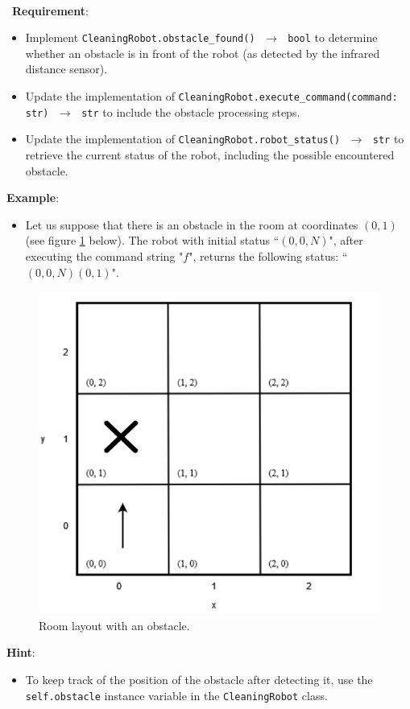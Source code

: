 \ \\ \
\noindent\textbf{Requirement}:
\begin{itemize}
    \item Implement \texttt{CleaningRobot.obstacle\_found() $\,\to\,$  bool} to determine whether an obstacle is in front of the robot (as detected by the infrared distance sensor).
    \item Update the implementation of \texttt{CleaningRobot.execute\_command(command: str) $\,\to\,$  str} to include the obstacle processing steps.
    \item Update the implementation of \texttt{CleaningRobot.robot\_status() $\,\to\,$  str} to retrieve the current status of the robot, including the possible encountered obstacle.
\end{itemize}

\noindent\textbf{Example}:
\begin{itemize}
    \item Let us suppose that there is an obstacle in the room at coordinates $(0,1)$ (see figure \ref{room_obstacle} below). The robot with initial status ``$(0,0,N)$", after executing the command string "$f$", returns the following status: ``$(0,0,N)(0,1)$".
\end{itemize}

\begin{figure}[H]
    \centering
    \includegraphics[width=0.5\linewidth]{figures/appendix/cleaning_robot_2.png}
    \caption{Room layout with an obstacle.}
    \label{room_obstacle}
\end{figure}

\noindent\textbf{Hint}:
\begin{itemize}
    \item To keep track of the position of the obstacle after detecting it, use the \texttt{self.obstacle} instance variable in the \texttt{CleaningRobot} class.
\end{itemize}


